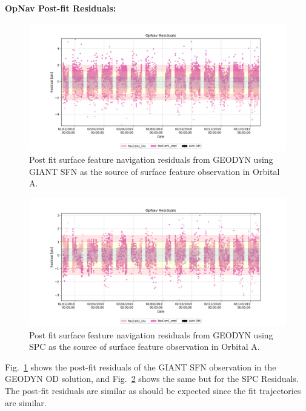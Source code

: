 \documentclass{src/RPI-SIW}
\begin{document}
\textbf{OpNav Post-fit Residuals:}
\begin{figure}[h]
	\centering
	\includegraphics[width=\columnwidth]{orbita_sfn.png}
    \caption{Post fit surface feature navigation residuals from GEODYN using GIANT SFN as the source of surface feature observation in Orbital A.}
    \label{fig:oasfn}
\end{figure}
\begin{figure}[h]
	\centering
	\includegraphics[width=\columnwidth]{orbita_spc.png}
    \caption{Post fit surface feature navigation residuals from GEODYN using SPC as the source of surface feature observation in Orbital A.}
    \label{fig:oaspc}
\end{figure}
Fig.~\ref{fig:oasfn} shows the post-fit residuals of the GIANT SFN observation in the GEODYN OD solution, and Fig.~\ref{fig:oaspc} shows the same but for the SPC Residuals.  The post-fit residuals are similar as should be expected since the fit trajectories are similar.

% 
% 
% 
\end{document}
